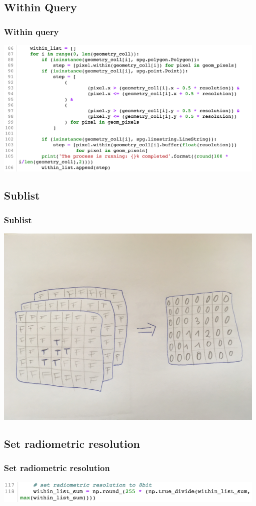 \documentclass[12pt]{beamer}
\begin{document}
\subsection{Within Query}

\begin{frame}\frametitle{Within query}

\includegraphics[scale=0.275]{within.png}
\end{frame}


\subsection{Sublist}

\begin{frame}\frametitle{Sublist}
\hspace{0.5cm} 
\includegraphics[scale=0.06]{IMG_5504.JPG}
\end{frame}

\subsection{Set radiometric resolution}
\begin{frame}\frametitle{Set radiometric resolution}
\includegraphics[scale=0.26]{radiometric.png}
\end{frame}
\end{document}
